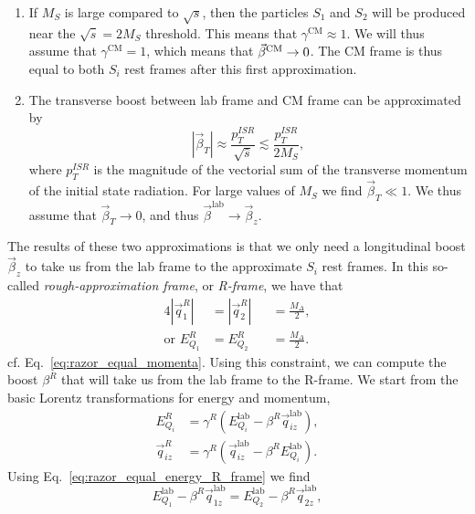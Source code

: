 \begin{enumerate}
  \item If $M_S$ is large compared to $\sqrt{s}$, then the particles $S_1$ and $S_2$ will be
produced near the $\sqrt{\hat{s}} = 2 M_S$ threshold. This means that $\gamma^{\textrm{CM}} \approx
1$. We will thus assume that $\gamma^{\textrm{CM}} = 1$, which means that $\vec{\beta}^{\textrm{CM}} \rightarrow 0$. 
The CM frame is thus equal to both $S_i$ rest frames after this first approximation. 
  \item The transverse boost between lab frame and CM frame can be approximated by 
  \begin{equation}
    |\vec{\beta}_T| \approx \frac{p_T^{ISR}}{\sqrt{\hat{s}}} \lesssim \frac{p_T^{ISR}}{2M_S},
  \end{equation}
  where $p_T^{ISR}$ is the magnitude of the vectorial sum of the transverse momentum of the initial
state radiation. For large values of $M_S$ we find $\vec{\beta}_T \ll 1$. We thus assume that
$\vec{\beta}_T \rightarrow 0$, and thus $\vec{\beta}^{\textrm{lab}} \rightarrow \vec{\beta}_z$.
\end{enumerate}
The results of these two approximations is that we only need a longitudinal boost $\vec{\beta}_z$
to take us from the lab frame to the approximate $S_i$ rest frames. 
In this so-called \textit{rough-approximation frame}, or \textit{R-frame}, we have that
\begin{alignat}{4}
  |\vec{q}^R_1|         &= |\vec{q}^R_2| &&= \frac{M_\Delta}{2} , \\
  \textrm{or } E_{Q_1}^R &= E_{Q_2}^R     &&= \frac{M_\Delta}{2}.
\label{eq:razor_equal_energy_R_frame}
\end{alignat}
cf. Eq.~\ref{eq:razor_equal_momenta}. Using this constraint, we can compute the boost $\beta^R$
that will take us from the lab frame to the R-frame. We start from the basic Lorentz
transformations for energy and momentum, 
\begin{align}
  E_{Q_i}^R      &= \gamma^R \left( E_{Q_i}^{\textrm{lab}} - \beta^R \vec{q}_{iz}^{\textrm{lab}}
\right) , \\
  \vec{q}_{iz}^R &= \gamma^R \left( \vec{q}_{iz}^{\textrm{lab}} - \beta^R E_{Q_i}^{\textrm{lab}}
\right) .
\end{align}
Using Eq.~\ref{eq:razor_equal_energy_R_frame} we find
\begin{equation}
  E_{Q_1}^{\textrm{lab}} - \beta^R \vec{q}_{1z}^{\textrm{lab}} = E_{Q_2}^{\textrm{lab}} - \beta^R
\vec{q}_{2z}^{\textrm{lab}} ,
\end{equation}
